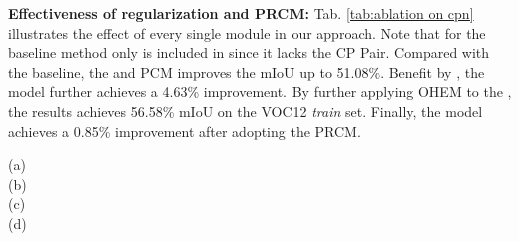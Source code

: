 \documentclass[10pt,twocolumn,letterpaper]{article}
\begin{document}
\noindent\textbf{Effectiveness of regularization and PRCM:}\; Tab. \ref{tab:ablation on cpn} illustrates the effect of every single module in our approach. Note that for the baseline method only  is included in  since it lacks the CP Pair. Compared with the baseline, the  and PCM improves the mIoU up to 51.08\%. Benefit by , the model further achieves a 4.63\% improvement. By further applying OHEM to the , the results achieves 56.58\% mIoU on the VOC12 \textit{train} set. Finally, the model achieves a 0.85\% improvement after adopting the PRCM.
\begin{figure*}[htbp]
\centering
\begin{minipage}[t]{0.02\linewidth}
        \centering
        {}
        \vspace{-0.8cm}
        {(a)}
        \\
        \vspace{1.1cm}
        {(b)}
        \\
        \vspace{1.1cm}
        {(c)}
        \\
        \vspace{1.0cm}  {(d)}
        \end{minipage}
\hspace{-3mm}
\end{figure*}
\end{document}
